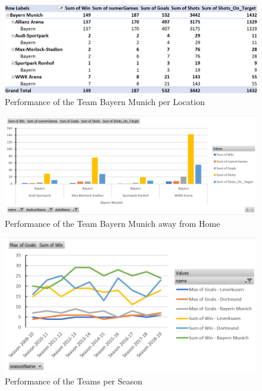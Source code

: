 \documentclass[11pt, journal]{IEEEtran}
\begin{document}
\begin{figure}[htb]
	\centering
		\includegraphics[width=1.0\columnwidth]{images/Pivot_Performance_Teams_Per_LocHomeAndAway_StateBayern}
	\caption{Performance of the Team Bayern Munich per Location }
	\label{fig:probov}
\end{figure}
\begin{figure}[htb]
	\centering
		\includegraphics[width=1.0\columnwidth]{images/Chart_Performance_Teams_Per_LocAway_StateBayern}
	\caption{Performance of the Team Bayern Munich away from Home}
	\label{fig:probov}
\end{figure}
\begin{figure}[htb]
	\centering
		\includegraphics[width=1.0\columnwidth]{images/Chart_Performance_Teams_Per_Season}
	\caption{Performance of the Teams per Season}
	\label{fig:probov}
\end{figure} 
\end{document}
